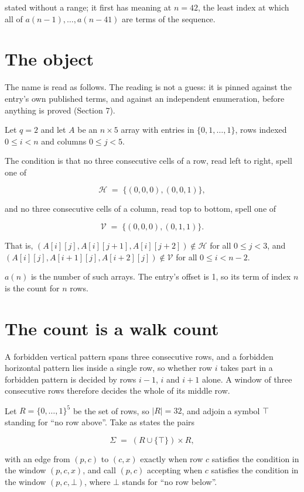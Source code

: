 \documentclass[11pt]{article}
\theoremstyle{definition}
\begin{document}
stated without a range; it first has meaning at $n = 42$, the least index at which all of $a(n-1),\dots,a(n-41)$ are terms of the sequence.

\section{The object}

The name is read as follows. The reading is not a guess: it is pinned against the entry's own published terms, and against an independent enumeration, before anything is proved (Section 7).

Let $q = 2$ and let $A$ be an $n \times 5$ array with entries in $\{0,1,\dots,1\}$, rows indexed $0 \le i < n$ and columns $0 \le j < 5$.

The condition is that no three consecutive cells of a row, read left to right, spell one of

\[\mathcal{H} \;=\; \{(0,0,0), (0,0,1)\},\]

and no three consecutive cells of a column, read top to bottom, spell one of

\[\mathcal{V} \;=\; \{(0,0,0), (0,1,1)\}.\]

That is, $(A[i][j],A[i][j{+}1],A[i][j{+}2]) \notin \mathcal{H}$ for all $0 \le j < 3$, and $(A[i][j],A[i{+}1][j],A[i{+}2][j]) \notin \mathcal{V}$ for all $0 \le i < n-2$.

$a(n)$ is the number of such arrays. The entry's offset is 1, so its term of index $n$ is the count for $n$ rows.

\section{The count is a walk count}

A forbidden vertical pattern spans three consecutive rows, and a forbidden horizontal pattern lies inside a single row, so whether row $i$ takes part in a forbidden pattern is decided by rows $i-1$, $i$ and $i+1$ alone. A window of three consecutive rows therefore decides the whole of its middle row.

Let $R = \{0,\dots,1\}^{5}$ be the set of rows, so $|R| = 32$, and adjoin a symbol $\top$ standing for ``no row above''. Take as states the pairs

\[\Sigma \;=\; (R \cup \{\top\}) \times R,\]

with an edge from $(p,c)$ to $(c,x)$ exactly when row $c$ satisfies the condition in the window $(p,c,x)$, and call $(p,c)$ accepting when $c$ satisfies the condition in the window $(p,c,\bot)$, where $\bot$ stands for ``no row below''.
\end{document}
